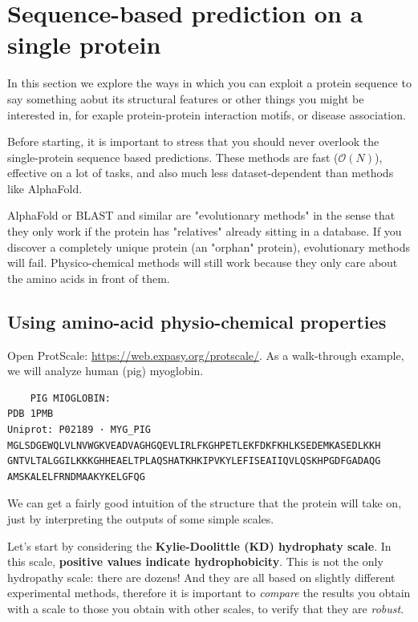 \section{Sequence-based prediction on a single protein}
In this section we explore the ways in which you can exploit a protein sequence
to say something aobut its structural features or other things you might be interested in,
for exaple protein-protein interaction motifs, or disease association.

Before starting, it is important to stress that you should never overlook the single-protein sequence based predictions.
These methods are fast ($\mathcal{O}(N)$), effective on a lot of tasks, and also much less dataset-dependent than methods
like AlphaFold. 

AlphaFold or BLAST and similar are "evolutionary methods" in the sense that they only work if the protein has "relatives" already sitting in a database.
If you discover a completely unique protein (an "orphan" protein), evolutionary methods will fail. 
Physico-chemical methods will still work because they only care about the amino acids in front of them. 


\subsection{Using amino-acid physio-chemical properties}
Open ProtScale: \url{https://web.expasy.org/protscale/}. As a walk-through example, we will analyze human (pig) myoglobin.

\begin{verbatim}
    PIG MIOGLOBIN: 
PDB 1PMB
Uniprot: P02189 · MYG_PIG
MGLSDGEWQLVLNVWGKVEADVAGHGQEVLIRLFKGHPETLEKFDKFKHLKSEDEMKASEDLKKH
GNTVLTALGGILKKKGHHEAELTPLAQSHATKHKIPVKYLEFISEAIIQVLQSKHPGDFGADAQG
AMSKALELFRNDMAAKYKELGFQG
\end{verbatim}

We can get a fairly good intuition of the structure that the protein will take on,
just by interpreting the outputs of some simple scales. 

Let's start by considering the \textbf{Kylie-Doolittle (KD) hydrophaty scale}. In this scale, \textbf{positive values indicate hydrophobicity}. This is not the only hydropathy scale: there are dozens!
And they are all based on slightly different experimental methods, therefore it is important to \textit{compare} the results you obtain with a scale to those you obtain 
with other scales, to verify that they are \textit{robust}. 


